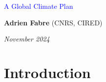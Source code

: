\documentclass[aspectratio=169,xcolor=dvipsnames, 11pt,mathserif]{beamer}
\begin{document}
\begin{frame}
\thispagestyle{empty}
\begin{center}
\begin{LARGE}
\textcolor{blue}{A Global Climate Plan}
\end{LARGE}

\vspace{1cm}
\textbf{Adrien Fabre} (CNRS, CIRED) %




\medskip
{}
\textit{November 2024} 

\end{center}

\bigskip

\end{frame}

\section{Introduction}
\end{document}
